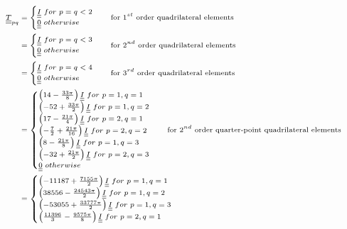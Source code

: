 \documentclass[review]{elsarticle}
\begin{document}
\begin{equation}\label{eq:Tpq}
\scriptsize
\begin{split}
\underline{\underline{T}}_{pq}&=\begin{cases}
\underline{\underline{I}}\ for\ p=q<2\\
\underline{\underline{0}}\ otherwise
\end{cases}\quad \text{for $1^{st}$ order quadrilateral elements}\\
&=\begin{cases}
\underline{\underline{I}}\ for\ p=q<3\\
\underline{\underline{0}}\ otherwise
\end{cases}\quad \text{for $2^{nd}$ order quadrilateral elements}\\
&=\begin{cases}
\underline{\underline{I}}\ for\ p=q<4\\
\underline{\underline{0}}\ otherwise
\end{cases}\quad \text{for $3^{rd}$ order quadrilateral elements}\\
&=\begin{cases}
\left(14-\frac{33\pi}{8}\right)\underline{\underline{I}}\ for\ p=1,q=1\\
\left(-52+\frac{33\pi}{2}\right)\underline{\underline{I}}\ for\ p=1,q=2\\
\left(17-\frac{21\pi}{4}\right)\underline{\underline{I}}\ for\ p=2,q=1\\
\left(-\frac{7}{2}+\frac{21\pi}{16}\right)\underline{\underline{I}}\ for\ p=2,q=2\\
\left(8-\frac{21\pi}{8}\right)\underline{\underline{I}}\ for\ p=1,q=3\\
\left(-32+\frac{21\pi}{2}\right)\underline{\underline{I}}\ for\ p=2,q=3\\
\underline{\underline{0}}\ otherwise
\end{cases}\quad \text{for $2^{nd}$ order quarter-point quadrilateral elements}\\
&=\begin{cases}
\left(-11187+\frac{7155\pi}{2}\right)\underline{\underline{I}}\ for\ p=1,q=1\\
\left(38556-\frac{24543\pi}{2}\right)\underline{\underline{I}}\ for\ p=1,q=2\\
\left(-53055+\frac{33777\pi}{2}\right)\underline{\underline{I}}\ for\ p=1,q=3\\
\left(\frac{11396}{3}-\frac{9575\pi}{8}\right)\underline{\underline{I}}\ for\ p=2,q=1\\

\end{cases}
\end{split}
\end{equation}
\end{document}
